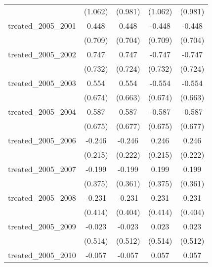 {\begin{tabular}{l*{4}{c}}
            &     (1.062)         &     (0.981)         &     (1.062)         &     (0.981)         \\
[1em]
treated\_2005\_2001&       0.448         &       0.448         &      -0.448         &      -0.448         \\
            &     (0.709)         &     (0.704)         &     (0.709)         &     (0.704)         \\
[1em]
treated\_2005\_2002&       0.747         &       0.747         &      -0.747         &      -0.747         \\
            &     (0.732)         &     (0.724)         &     (0.732)         &     (0.724)         \\
[1em]
treated\_2005\_2003&       0.554         &       0.554         &      -0.554         &      -0.554         \\
            &     (0.674)         &     (0.663)         &     (0.674)         &     (0.663)         \\
[1em]
treated\_2005\_2004&       0.587         &       0.587         &      -0.587         &      -0.587         \\
            &     (0.675)         &     (0.677)         &     (0.675)         &     (0.677)         \\
[1em]
treated\_2005\_2006&      -0.246         &      -0.246         &       0.246         &       0.246         \\
            &     (0.215)         &     (0.222)         &     (0.215)         &     (0.222)         \\
[1em]
treated\_2005\_2007&      -0.199         &      -0.199         &       0.199         &       0.199         \\
            &     (0.375)         &     (0.361)         &     (0.375)         &     (0.361)         \\
[1em]
treated\_2005\_2008&      -0.231         &      -0.231         &       0.231         &       0.231         \\
            &     (0.414)         &     (0.404)         &     (0.414)         &     (0.404)         \\
[1em]
treated\_2005\_2009&      -0.023         &      -0.023         &       0.023         &       0.023         \\
            &     (0.514)         &     (0.512)         &     (0.514)         &     (0.512)         \\
[1em]
treated\_2005\_2010&      -0.057         &      -0.057         &       0.057         &       0.057         \\

\end{tabular}}
